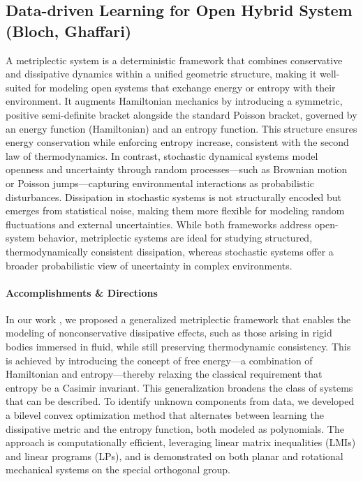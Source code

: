 \documentclass[letterpaper,11pt]{article}
\begin{document}
\subsection{Data-driven Learning for Open Hybrid System (Bloch, Ghaffari)}\label{sec:metriplectic}

A metriplectic system is a deterministic framework that combines conservative and dissipative dynamics within a unified geometric structure, making it well-suited for modeling open systems that exchange energy or entropy with their environment.
It augments Hamiltonian mechanics by introducing a symmetric, positive semi-definite bracket alongside the standard Poisson bracket, governed by an energy function (Hamiltonian) and an entropy function.
This structure ensures energy conservation while enforcing entropy increase, consistent with the second law of thermodynamics.
In contrast, stochastic dynamical systems model openness and uncertainty through random processes—such as Brownian motion or Poisson jumps—capturing environmental interactions as probabilistic disturbances.
Dissipation in stochastic systems is not structurally encoded but emerges from statistical noise, making them more flexible for modeling random fluctuations and external uncertainties.
While both frameworks address open-system behavior, metriplectic systems are ideal for studying structured, thermodynamically consistent dissipation, whereas stochastic systems offer a broader probabilistic view of uncertainty in complex environments.

\paragraph{Accomplishments \& Directions}

In our work \cite{teng2024generalized}, we proposed a generalized metriplectic framework that enables the modeling of nonconservative dissipative effects, such as those arising in rigid bodies immersed in fluid, while still preserving thermodynamic consistency.
This is achieved by introducing the concept of free energy—a combination of Hamiltonian and entropy—thereby relaxing the classical requirement that entropy be a Casimir invariant.
This generalization broadens the class of systems that can be described.
To identify unknown components from data, we developed a bilevel convex optimization method that alternates between learning the dissipative metric and the entropy function, both modeled as polynomials.
The approach is computationally efficient, leveraging linear matrix inequalities (LMIs) and linear programs (LPs), and is demonstrated on both planar and rotational mechanical systems on the special orthogonal group.
\end{document}
